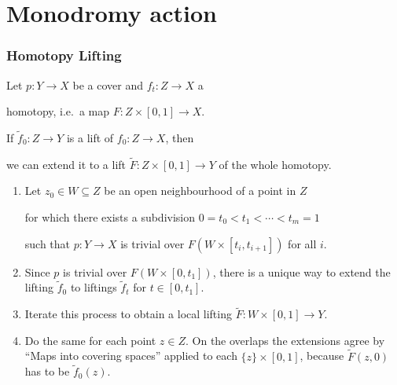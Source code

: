 \documentclass[notheorems, hyperref={backref}]{beamer}
\begin{document}
\section{Monodromy action}
\begin{frame}
    \frametitle{Homotopy Lifting}
    Let $p\colon Y\to X$ be a cover and $f_{t}\colon Z\to X$ a
    
    homotopy, i.e.~a map $F\colon Z\times [0,1]\to X$.
    \pause

    If $\tilde{f}_{0}\colon Z\to Y$ is a lift of $f_{0}\colon Z\to X$, then 
    
    we can extend it to a lift $\tilde{F}\colon Z\times [0,1]\to Y$ of the whole homotopy.
    \pause
    \pause

    \begin{enumerate}[label=\arabic*)]
	\item Let $z_{0}\in W\subseteq Z$ be an open neighbourhood of a point in $Z$

	    for which there exists a subdivision $0=t_{0}<t_{1}<\cdots <t_{m}=1$

	    such that $p\colon Y\to X$ is trivial over $F(W\times [t_{i},t_{i+1}])$ for all $i$.
	    \pause
	\item Since $p$ is trivial over $F(W\times [0,t_{1}])$, there is a unique way to extend the lifting $\tilde{f}_{0}$ to liftings $\tilde{f}_{t}$ for $t\in [0,t_{1}]$.
	    \pause
	\item Iterate this process to obtain a local lifting $\tilde{F}\colon W\times [0,1]\to Y$.
	    \pause
	\item Do the same for each point $z\in Z$.
	    On the overlaps the extensions agree by ``Maps into covering spaces'' applied to each $\{z\}\times [0,1]$, because $\tilde{F}(z,0)$ has to be $\tilde{f}_{0}(z)$.
    \end{enumerate}
\end{frame}
\end{document}
